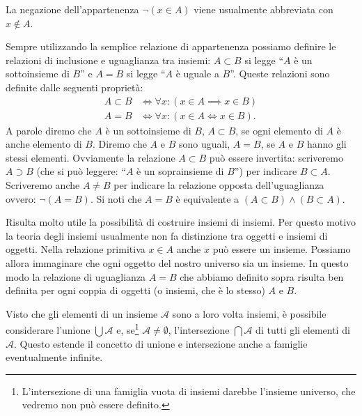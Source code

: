La negazione dell'appartenenza $\lnot (x \in A)$ viene usualmente
abbreviata con $x \not \in A$.

Sempre utilizzando la semplice relazione di appartenenza possiamo definire
le relazioni di inclusione e uguaglianza tra insiemi:
$A \subset B$ si legge ``$A$ è un sottoinsieme di $B$''
e $A=B$ si legge ``$A$ è uguale a $B$''. Queste relazioni sono
definite dalle seguenti proprietà:
\begin{align*}
  A \subset B &\iff \forall x\colon (x\in A \implies x\in B)\\
  A = B &\iff \forall x\colon (x\in A \iff x \in B).
\end{align*}
A parole diremo che $A$ è un sottoinsieme di $B$, 
$A \subset B$, se ogni elemento di $A$ è anche elemento di $B$.
Diremo che $A$ e $B$ sono uguali, $A=B$, 
se $A$ e $B$ hanno gli stessi elementi.
Ovviamente la relazione $A \subset B$ può essere invertita: scriveremo
$A\supset B$ (che si può leggere: ``$A$ è un soprainsieme di $B$'')
per indicare $B \subset A$. Scriveremo anche $A \neq B$ per indicare
la relazione opposta dell'uguaglianza ovvero: $\lnot(A=B)$.
Si noti che $A=B$ è equivalente a $(A\subset B) \land (B\subset A)$.

Risulta molto utile la possibilità di costruire insiemi di insiemi.
Per questo motivo la teoria degli insiemi usualmente non fa distinzione
tra oggetti e insiemi di oggetti. Nella relazione primitiva $x\in A$ anche
$x$ può essere un insieme. Possiamo allora immaginare che ogni oggetto del
nostro universo sia un insieme. In questo modo la relazione di uguaglianza $A=B$
che abbiamo definito sopra risulta ben definita per ogni coppia di oggetti
(o insiemi, che è lo stesso) $A$ e $B$.

Visto che gli elementi di un insieme $\mathcal A$ sono a loro volta insiemi,
è possibile considerare l'unione $\bigcup \mathcal A$
e, se\footnote{%
L'intersezione di una famiglia vuota di insiemi darebbe l'insieme 
universo, che vedremo non può essere definito.
} 
$\mathcal A \neq \emptyset$, l'intersezione $\bigcap \mathcal A$ di tutti gli elementi
di $\mathcal A$.
Questo estende il concetto di unione e intersezione anche a famiglie
eventualmente infinite.

